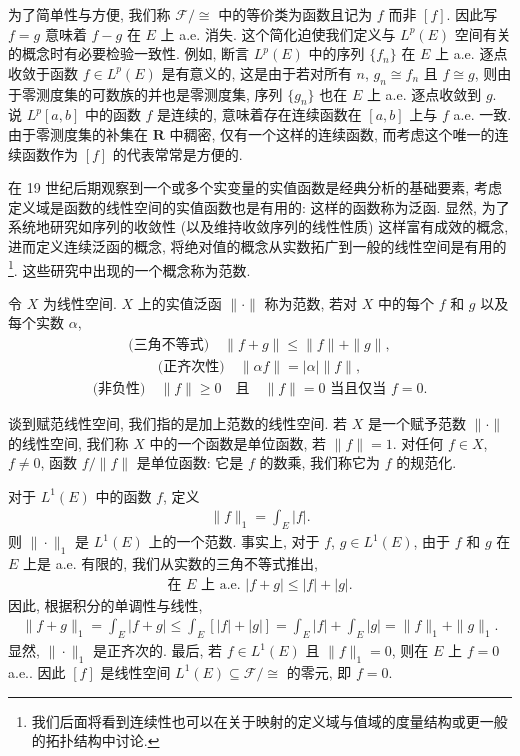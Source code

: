 \documentclass[../../main.tex]{subfiles}
\begin{document}
为了简单性与方便, 我们称 $\mathcal{F}/\cong$ 中的等价类为函数且记为 $f$ 而非 $[f]$. 因此写 $f=g$ 意味着 $f-g$ 在 $E$ 上 a.e. 消失. 这个简化迫使我们定义与 $L^{p}(E)$ 空间有关的概念时有必要检验一致性. 例如, 断言 $L^{p}(E)$ 中的序列 $\{f_{n}\}$ 在 $E$ 上 a.e. 逐点收敛于函数 $f\in L^{p}(E)$ 是有意义的, 这是由于若对所有 $n$, $g_{n}\cong f_{n}$ 且 $f\cong g$, 则由于零测度集的可数族的并也是零测度集, 序列 $\{g_{n}\}$ 也在 $E$ 上 a.e. 逐点收敛到 $g$. 说 $L^{p}[a,b]$ 中的函数 $f$ 是连续的, 意味着存在连续函数在 $[a,b]$ 上与 $f$ a.e. 一致. 由于零测度集的补集在 $\mathbf{R}$ 中稠密, 仅有一个这样的连续函数, 而考虑这个唯一的连续函数作为 $[f]$ 的代表常常是方便的.

在 19 世纪后期观察到一个或多个实变量的实值函数是经典分析的基础要素, 考虑定义域是函数的线性空间的实值函数也是有用的: 这样的函数称为泛函. 显然, 为了系统地研究如序列的收敛性 (以及维持收敛序列的线性性质) 这样富有成效的概念, 进而定义连续泛函的概念, 将绝对值的概念从实数拓广到一般的线性空间是有用的\footnote{我们后面将看到连续性也可以在关于映射的定义域与值域的度量结构或更一般的拓扑结构中讨论.}. 这些研究中出现的一个概念称为范数.

\begin{definition}[范数]\label{definition:ch07-范数}
令 $X$ 为线性空间. $X$ 上的实值泛函 $\|\cdot\|$ 称为范数, 若对 $X$ 中的每个 $f$ 和 $g$ 以及每个实数 $\alpha$,
\begin{align*}
\text{(三角不等式)}\quad\|f+g\|\leqslant\|f\|+\|g\|,
\end{align*}
\begin{align*}
\text{(正齐次性)}\quad\|\alpha f\|=|\alpha|\|f\|,
\end{align*}
\begin{align*}
\text{(非负性)}\quad\|f\|\geqslant 0\quad\text{且}\quad\|f\|=0\text{ 当且仅当 }f=0.
\end{align*}
\end{definition}

谈到赋范线性空间, 我们指的是加上范数的线性空间. 若 $X$ 是一个赋予范数 $\|\cdot\|$ 的线性空间, 我们称 $X$ 中的一个函数是单位函数, 若 $\|f\|=1$. 对任何 $f\in X$, $f\neq 0$, 函数 $f/\|f\|$ 是单位函数: 它是 $f$ 的数乘, 我们称它为 $f$ 的规范化.

\begin{example}[赋范线性空间 $L^{1}(E)$]\label{example:ch07-L1范数}
对于 $L^{1}(E)$ 中的函数 $f$, 定义
\begin{align*}
\|f\|_{1}=\int_{E}|f|.
\end{align*}
则 $\|\cdot\|_{1}$ 是 $L^{1}(E)$ 上的一个范数. 事实上, 对于 $f$, $g\in L^{1}(E)$, 由于 $f$ 和 $g$ 在 $E$ 上是 a.e. 有限的, 我们从实数的三角不等式推出,
\begin{align*}
\text{在 }E\text{ 上 a.e. }|f+g|\leqslant|f|+|g|.
\end{align*}
因此, 根据积分的单调性与线性,
\begin{align*}
\|f+g\|_{1}=\int_{E}|f+g|\leqslant\int_{E}[|f|+|g|]=\int_{E}|f|+\int_{E}|g|=\|f\|_{1}+\|g\|_{1}.
\end{align*}
显然, $\|\cdot\|_{1}$ 是正齐次的. 最后, 若 $f\in L^{1}(E)$ 且 $\|f\|_{1}=0$, 则在 $E$ 上 $f=0$ a.e.. 因此 $[f]$ 是线性空间 $L^{1}(E)\subseteq\mathcal{F}/\cong$ 的零元, 即 $f=0$.
\end{example}
\end{document}
